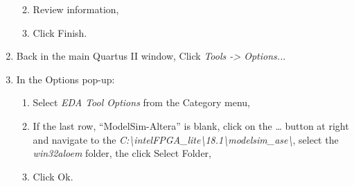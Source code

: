 \begin{enumerate}
        \begin{enumerate}
                \def\labelenumii{\alph{enumii}.}
            \item
                Review information,
            \item
                Click Finish.
        \end{enumerate}
    \item
        Back in the main Quartus II window, Click \emph{Tools -\textgreater{}
        Options..}.
    \item
        In the Options pop-up:

        \begin{enumerate}
                \def\labelenumii{\alph{enumii}.}
            \item
                Select \emph{EDA Tool Options} from the Category menu,
            \item
                If the last row, ``ModelSim-Altera'' is blank, click on the \ldots{}
                button at right and navigate to the
                \emph{C:\textbackslash intelFPGA\_lite\textbackslash18.1\textbackslash modelsim\_ase\textbackslash{}},
                select the \emph{win32aloem} folder, the click Select Folder,
            \item
                Click Ok.
        \end{enumerate}
\end{enumerate}
